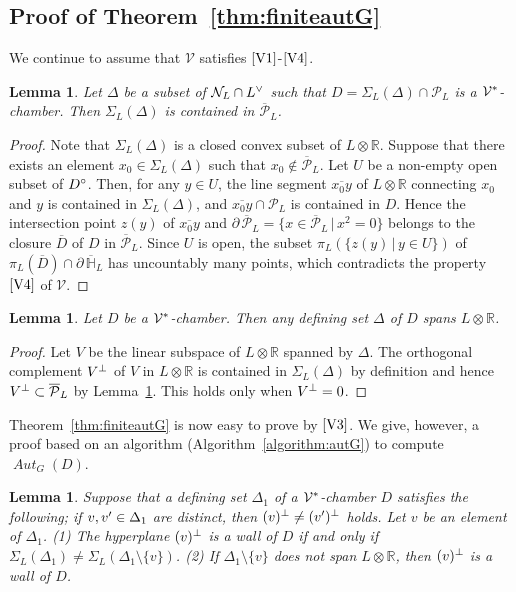 \documentclass{amsart}
\theoremstyle{plain}
\newtheorem{lemma}[theorem]{Lemma}
\theoremstyle{definition}
\theoremstyle{remark}
\numberwithin{equation}{section}
\numberwithin{table}{section}
\numberwithin{figure}{section}
\renewcommand{\H}{\mathord{\mathbb H}}
\newcommand{\R}{\mathord{\mathbb R}}
\newcommand{\NNN}{\mathord{\mathcal N}}
\newcommand{\PPP}{\mathord{\mathcal P}}
\newcommand{\VVV}{\mathord{\mathcal V}}
\newcommand{\shortset}[2]{\{ {#1} \,|\, {#2}   \}}
\newcommand{\tensor}{\otimes}
\newcommand{\sprime}{\sp\prime}
\newcommand{\spcirc}{\sp{\mathord{\circ}}}
\newcommand{\sperp}{\sp{\perp}}
\newcommand{\dual}{\sp{\vee}}
\newcommand{\bdr}{\partial\,}
\newcommand{\aut}{\operatorname{\mathit {Aut}}\nolimits}
\newcommand{\sphyp}{\sp*}
\newcommand{\clPPP}{\overline{\PPP}}
\newcommand{\clH}{\overline{\H}}
\newcommand{\bdrclH}{\bdr\clH}
\newcommand{\lineseg}[1]{\overline{#1}}
\newcommand{\propVone}{\mathord{\rm [V1]}}
\newcommand{\propVthree}{\mathord{\rm [V3]}}
\newcommand{\propVfour}{\mathord{\rm [V4]}}
\begin{document}
\subsection{Proof of Theorem~\ref{thm:finiteautG}}
%
We continue to assume that  $\VVV$ satisfies $\propVone$-$\propVfour$.
 \begin{lemma}\label{lem:clSigma}
 Let
 $\Delta$ be a subset of $\NNN_L\cap L\dual$ such that $D=\Sigma_L(\Delta)\cap\PPP_L$ is
 a  $\VVV\sphyp$-chamber.
 Then $\Sigma_L(\Delta)$ is contained  in $\clPPP_L$.
 \end{lemma}
 \begin{proof}
 Note that $\Sigma_L(\Delta)$ is a closed convex subset of $L\tensor\R$.
 Suppose that there exists an element $x_0\in \Sigma_L(\Delta)$
 such that $x_0\notin\clPPP_L$.
 Let $U$ be a non-empty open subset of $D\spcirc$.
 Then,
 for any $y\in U$,
 the line segment $\lineseg{x_0 y}$  of $L\tensor\R$ connecting $x_0$ and $y$
 is contained in $\Sigma_L(\Delta)$,
 and $\lineseg{x_0 y}\cap \PPP_L$  is contained in  $D$.
 Hence the intersection point $z(y)$ of $\lineseg{x_0 y}$ and 
 $\bdr\clPPP_L=\shortset{x\in \clPPP_L}{x^2=0}$ 
 belongs to  the closure $\overline{D}$ of $D$ in $\clPPP_L$.
 Since $U$ is open,
 the subset
 $\pi_L(\shortset{z(y)}{y\in U})$
 of $\pi_L(\overline{D})\cap\bdrclH_L$ has uncountably many points,
 which contradicts the property~$\propVfour$ of $\VVV$.
 \end{proof}
 \begin{lemma}\label{lem:span}
 Let $D$ be a $\VVV\sphyp$-chamber.
 Then any defining set $\Delta$ of $D$ spans $L\tensor\R$.
 \end{lemma}
 \begin{proof}
 Let $V$ be the linear subspace  of $L\tensor \R$ spanned by $\Delta$.
 The orthogonal complement $V\sperp$ of $V$  in $L\tensor\R$
 is contained in $\Sigma_L(\Delta)$ by definition and hence $V\sperp\subset\clPPP_L$ by 
 Lemma~\ref{lem:clSigma}.
 This holds only when $V\sperp=0$.
\end{proof}
%
%
 Theorem~\ref{thm:finiteautG} is now easy to prove by $\propVthree$. 
 We give, however,  a proof based on 
 an algorithm (Algorithm~\ref{algorithm:autG}) to compute $\aut_G(D)$.
%
\begin{lemma}\label{lem:iswall}
Suppose that a defining set $\Delta_1$ of a $\VVV\sphyp$-chamber $D$
satisfies the following;
if $v, v\sprime\in \Delta_1$ are distinct,
then $(v)\sperp\ne (v\sprime)\sperp$ holds.
Let $v$ be an element of $\Delta_1$.
{\rm (1)}
The hyperplane $(v)\sperp$ is a wall of $D$ if and only if 
$\Sigma_L(\Delta_1) \ne \Sigma_L(\Delta_1\setminus \{v\})$.
{\rm (2)}
If $\Delta_1\setminus\{v\}$ does not span $L\tensor \R$,
then $(v)\sperp$ is a wall of $D$.
\end{lemma}
\end{document}
